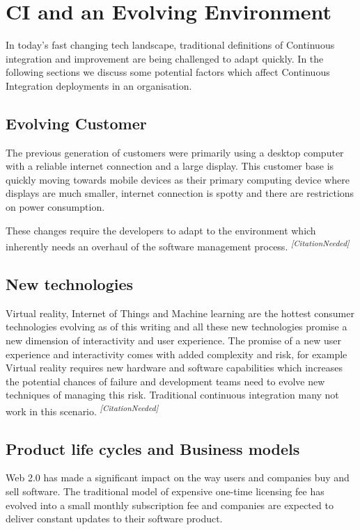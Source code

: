 \documentclass[10pt,conference]{IEEEtran}
\newcommand{\citationneeded}{\textsuperscript{\textit{[CitationNeeded]}}}
\begin{document}
\section*{CI and an Evolving Environment}

In today's fast changing tech landscape, traditional definitions of Continuous integration and improvement are being challenged to adapt quickly. In the following sections we discuss some potential factors which affect Continuous Integration deployments in an organisation.

\subsection*{Evolving Customer}
The previous generation of customers were primarily using a desktop computer with a reliable internet connection and a large display. This customer base is quickly moving towards mobile devices as their primary computing device where displays are much smaller, internet connection is spotty and there are restrictions on power consumption. 

These changes require the developers to adapt to the environment which inherently needs an overhaul of the software management process. \citationneeded


\subsection*{New technologies}

Virtual reality, Internet of Things and Machine learning are the hottest consumer technologies evolving as of this writing and all these new technologies promise a new dimension of interactivity and user experience. The promise of a new user experience and interactivity comes with added complexity and risk, for example Virtual reality requires new hardware and software capabilities which increases the potential chances of failure and development teams need to evolve new techniques of managing this risk. Traditional continuous integration many not work in this scenario. \citationneeded

\subsection*{Product life cycles and Business models}

Web 2.0 has made a significant impact on the way users and companies buy and sell software. The traditional model of expensive one-time licensing fee has evolved into a small monthly subscription fee and companies are expected to deliver constant updates to their software product. 
\end{document}
